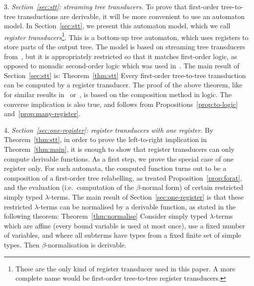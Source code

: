     \smallskip
    3. \emph{Section~\ref{sec:stt}: streaming tree transducers. }To prove that  first-order tree-to-tree transductions are derivable, it will be more convenient to use an automaton model. In Section~\ref{sec:stt}, we present  this  automaton model, which we call \emph{register transducers}\footnote{These are the only kind of register transducer used in this paper. A more complete name would be first-order tree-to-tree register transducers.}. This  is a bottom-up tree automaton, which uses registers to store parts of the output tree. The model is based on streaming tree transducers from~\cite{alur2017streaming}, but it is  appropriately restricted so that it matches first-order logic, as opposed to monadic second-order logic which was used in~\cite{alur2017streaming}. The main result of Section~\ref{sec:stt} is:
    \announce
    {Theorem~\ref{thm:stt}}
    {Every first-order  tree-to-tree transduction can be computed by a  register transducer.}
    The proof of the above theorem, like for similar results in~\cite{alur2017streaming} or~\cite[Theorem 23]{engelfrietMSODefinableString2001}, is based on the composition method in logic. 
    The converse implication is also true, and follows from Propositions~\ref{prop:to-logic} and~\ref{prop:many-register}.
    
    \smallskip
     4. \emph{Section~\ref{sec:one-register}: register transducers with one register.} By Theorem~\ref{thm:stt}, in order to prove the left-to-right implication in Theorem~\ref{thm:main}, it is enough to show that register transducers can only compute  derivable  functions. As a first step, we prove the special case of one register only. For such automata, the computed function turns out to be a composition of a first-order tree relabelling, as treated  Proposition~\ref{prop:forat}, and the evaluation (i.e.~computation of the $\beta$-normal form) of certain restricted   simply typed $\lambda$-terms. The main result of Section~\ref{sec:one-register} is that these restricted $\lambda$-terms can be normalised by a derivable function, as stated in the following theorem:
    \announce
    {Theorem~\ref{thm:normalise}}
    {Consider  simply typed $\lambda$-terms which are affine (every bound variable is used at most once), use  a fixed number of variables, and where all subterms have types from a fixed finite set of simple types. Then $\beta$-normalisation is derivable. }
    
